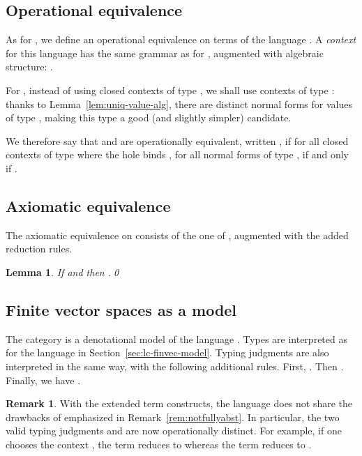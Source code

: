 \documentclass[10pt]{article}
\theoremstyle{plain}
\newtheorem{lemma}[theorem]{Lemma}
\theoremstyle{definition}
\newtheorem{remark}[theorem]{Remark}
\begin{document}
\subsection{Operational equivalence}
\label{sec:lc-cat-alg}

As for , we define an operational equivalence on terms of the 
language
. A {\em context } for this language has the same
grammar as for , augmented with algebraic
structure: 
.

For , instead of using closed contexts of type
, we shall use contexts of type : thanks to
Lemma~\ref{lem:uniq-value-alg}, there are distinct normal forms for
values of type , making this type a good (and slightly simpler)
candidate.

We therefore say that  and  are
operationally equivalent, written , if for all closed
contexts  of type  where the hole binds , for
all  normal forms of type ,  if and only if .


\subsection{Axiomatic equivalence}

The axiomatic equivalence on  consists of the one
of , augmented with the added reduction rules. 


\begin{lemma}
  \label{lem:opax-alg}
  If  and  then .\qed
\end{lemma}




\subsection{Finite vector spaces as a model}
\label{sec:model-alglc}

The category  is a denotational model of the language
. Types are interpreted as for the language
 in Section~\ref{sec:lc-finvec-model}. Typing judgments are
also interpreted in the same way, with the following additional
rules. First,
. Then . Finally, we have
.

\begin{remark}
With the extended term constructs, the language 
does not share the drawbacks of  emphasized in
Remark~\ref{rem:notfullyabst}. In particular, the two valid typing
judgments  and  are now operationally
distinct. For example, if one chooses the context , the
term  reduces to  whereas the term
 reduces to .
\end{remark}
\end{document}
